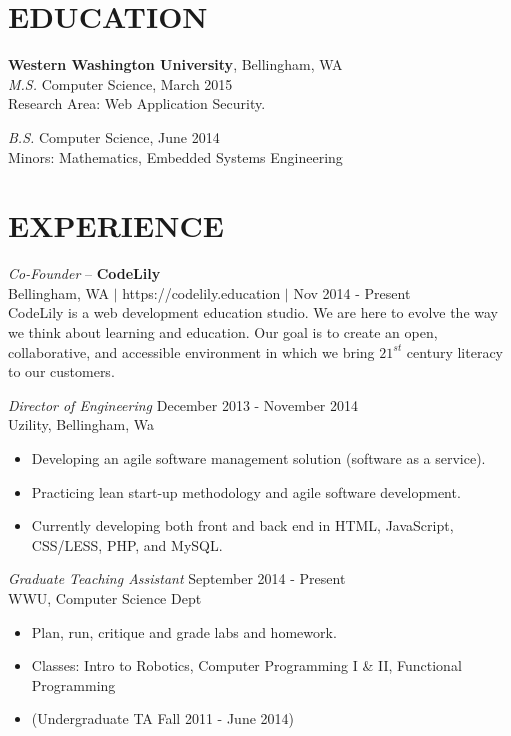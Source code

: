 \documentclass[line,margin]{res}
\begin{document}
\address{425.241.7977 $|$ kyle.rader@ieee.org $|$ https://kylerader.ninja $|$ github.com/kyle-rader}

\begin{resume}
 
\section{EDUCATION}
	{\bf Western Washington University}, Bellingham, WA \\
	{\sl M.S.} Computer Science, {\small March 2015} \\
	Research Area: Web Application Security.
	
	{\sl B.S.} Computer Science, {\small June 2014} \\
	Minors: Mathematics, Embedded Systems Engineering

\section{EXPERIENCE}

	{\sl Co-Founder} -- {\bf CodeLily}\\
	{\footnotesize Bellingham, WA $|$ https://codelily.education $|$ Nov 2014 - Present}\\
	CodeLily is a web development education studio.  We are here to evolve the way we think about learning and education.
	Our goal is to create an open, collaborative, and accessible environment in which we bring $21^{st}$ century literacy to our customers.  

		{\sl Director of Engineering} \hfill December 2013 - November 2014 \\
                	Uzility, Bellingham, Wa
               	 \begin{itemize}  \itemsep -2pt
                		\item Developing an agile software management solution (software as a service).
                		\item Practicing lean start-up methodology and agile software development. 
                		\item Currently developing both front and back end in HTML, JavaScript, CSS/LESS, PHP, and MySQL.
                	\end{itemize}

                	{\sl Graduate Teaching Assistant} \hfill        September 2014 - Present \\
                	WWU, Computer Science Dept
                  	\begin{itemize} \itemsep -2pt
                   		\item Plan, run, critique and grade labs and homework.
			\item Classes: Intro to Robotics, Computer Programming I \& II, Functional Programming
			\item (Undergraduate TA Fall 2011 - June 2014)
                   	\end{itemize}


\end{resume}
\end{document}
